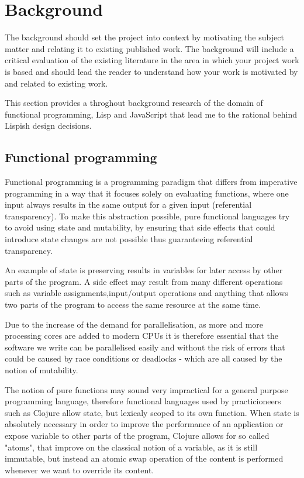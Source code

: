 \chapter{Background}
The background should set the project into context by motivating the subject matter and relating it to existing published work. The background will include a critical evaluation of the existing literature in the area in which your project work is based and should lead the reader to understand how your work is motivated by and related to existing work.

This section provides a throghout background research of the domain of functional programming, Lisp and JavaScript that lead me to the rational behind Lispish design decisions.

\section{Functional programming}
Functional programming is a programming paradigm that differs from imperative programming in a way that it focuses solely on evaluating functions, where one input always results in the same output for a given input (referential transparency). To make this abstraction possible, pure functional languages try to avoid using state and mutability, by ensuring that side effects that could introduce state changes are not possible thus guaranteeing referential transparency.

An example of state is preserving results in variables for later access by other parts of the program. A side effect may result from many different operations such as variable assignments,input/output operations and anything that allows two parts of the program to access the same resource at the same time.

Due to the increase of the demand for parallelisation, as more and more processing cores are added to modern CPUs it is therefore essential that the software we write can be parallelised easily and without the risk of errors that could be caused by race conditions or deadlocks - which are all caused by the notion of mutability. 

The notion of pure functions may sound very impractical for a general purpose programming language, therefore functional languages used by practicioneers such as Clojure allow state, but lexicaly scoped to its own function. 
When state is absolutely necessary in order to improve the performance of an application or expose variable to other parts of the program, Clojure allows for so called "atoms", that improve on the classical notion of a variable, as it is still immutable, but instead an atomic swap operation of the content is performed whenever we want to override its content.

